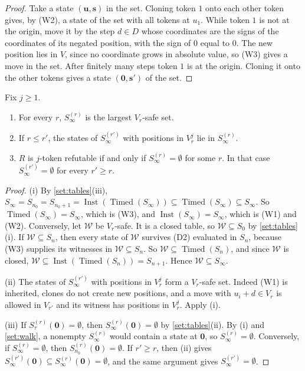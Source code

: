 \begin{proof}
Take a state $(\mathbf u,\mathbf s)$ in the set. Cloning token $1$ onto each other token gives, by (W2), a state of the set with all tokens at $u_1$. While token $1$ is not at the origin, move it by the step $d\in D$ whose coordinates are the signs of the coordinates of its negated position, with the sign of $0$ equal to $0$. The new position lies in $V$, since no coordinate grows in absolute value, so (W3) gives a move in the set. After finitely many steps token $1$ is at the origin. Cloning it onto the other tokens gives a state $(\mathbf 0,\mathbf s')$ of the set.
\end{proof}

\begin{lemma}\label{set:stable}
Fix $j\ge1$.
\begin{enumerate}
\item[(i)] For every $r$, $S^{(r)}_\infty$ is the largest $V_r$-safe set.
\item[(ii)] If $r\le r'$, the states of $S^{(r')}_\infty$ with positions in $V_r^j$ lie in $S^{(r)}_\infty$.
\item[(iii)] $R$ is $j$-token refutable if and only if $S^{(r)}_\infty=\emptyset$ for some $r$. In that case $S^{(r')}_\infty=\emptyset$ for every $r'\ge r$.
\end{enumerate}
\end{lemma}

\begin{proof}
(i) By \cref{set:tables}(iii), $S_\infty=S_{n_0}=S_{n_0+1}=\operatorname{Inst}(\operatorname{Timed}(S_\infty))\subseteq\operatorname{Timed}(S_\infty)\subseteq S_\infty$. So $\operatorname{Timed}(S_\infty)=S_\infty$, which is (W3), and $\operatorname{Inst}(S_\infty)=S_\infty$, which is (W1) and (W2). Conversely, let $\mathcal W$ be $V_r$-safe. It is a closed table, so $\mathcal W\subseteq S_0$ by \cref{set:tables}(i). If $\mathcal W\subseteq S_n$, then every state of $\mathcal W$ survives (D2) evaluated in $S_n$, because (W3) supplies its witnesses in $\mathcal W\subseteq S_n$. So $\mathcal W\subseteq\operatorname{Timed}(S_n)$, and since $\mathcal W$ is closed, $\mathcal W\subseteq\operatorname{Inst}(\operatorname{Timed}(S_n))=S_{n+1}$. Hence $\mathcal W\subseteq S_\infty$.

(ii) The states of $S^{(r')}_\infty$ with positions in $V_r^j$ form a $V_r$-safe set. Indeed (W1) is inherited, clones do not create new positions, and a move with $u_i+d\in V_r$ is allowed in $V_{r'}$ and its witness has positions in $V_r^j$. Apply (i).

(iii) If $S^{(r)}_\tau(\mathbf 0)=\emptyset$, then $S^{(r)}_\infty(\mathbf 0)=\emptyset$ by \cref{set:tables}(ii). By (i) and \cref{set:walk}, a nonempty $S^{(r)}_\infty$ would contain a state at $\mathbf 0$, so $S^{(r)}_\infty=\emptyset$. Conversely, if $S^{(r)}_\infty=\emptyset$, then $S^{(r)}_{n_0}(\mathbf 0)=\emptyset$. If $r'\ge r$, then (ii) gives $S^{(r')}_\infty(\mathbf 0)\subseteq S^{(r)}_\infty(\mathbf 0)=\emptyset$, and the same argument gives $S^{(r')}_\infty=\emptyset$.
\end{proof}

